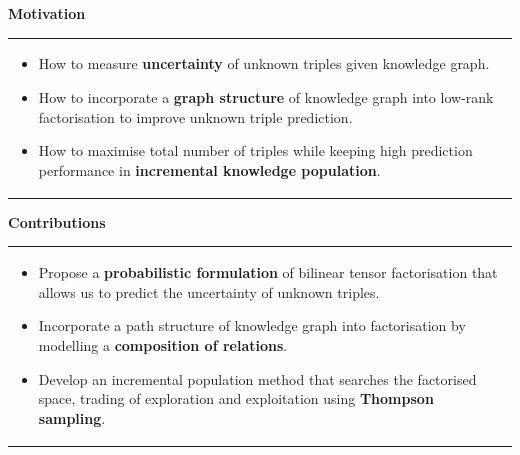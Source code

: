 \documentclass[a0,landscape]{a0poster}
\newcommand{\itemup}{\vspace{-.5cm}}
\begin{document}
\begin{multicols}{3}
\small

\color{DarkSlateGray}

\noindent\textbf{\Large Motivation}

\vspace{.2cm}

\begin{tabular}{p{\linewidth}}
\cellcolor{DarkSlateGray}
\color{white}
\begin{itemize}
\itemup
\item How to measure \textbf{uncertainty} of unknown triples given knowledge graph.
\item How to incorporate a \textbf{graph structure} of knowledge graph into low-rank factorisation to improve unknown triple prediction.
\item How to maximise total number of triples while keeping high prediction performance in \textbf{incremental knowledge population}.
\itemup
\end{itemize}
\end{tabular}

\vspace{.5cm}

\noindent\textbf{\Large Contributions}

\vspace{.2cm}

\begin{tabular}{p{\linewidth}}
\cellcolor{DarkSlateGray}
\color{white}
\begin{itemize}
\itemup
\item Propose a \textbf{probabilistic formulation} of bilinear tensor factorisation that allows us to predict the uncertainty of unknown triples.
\item Incorporate a path structure of knowledge graph into factorisation by modelling a \textbf{composition of relations}.
\item Develop an incremental population method that searches the factorised space, trading of exploration and exploitation using \textbf{Thompson sampling}.
\itemup
\end{itemize}
\end{tabular}



\color{Black}



\end{multicols}
\end{document}
